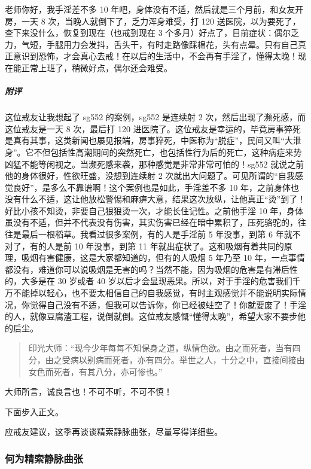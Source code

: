 \begin{case}
    老师你好，我手淫差不多 10 年吧，身体没有不适，然后就是三个月前，和女友开房，一天 8 次，当晚人就倒下了，乏力浑身难受，打 120 送医院，以为要死了，查下来没什么，恢复到现在（也戒到现在 3 个多月）好点了，目前症状：偶尔乏力，气短，手腿用力会发抖，舌头干，有时走路像踩棉花，头有点晕。只有自己真正意识到恐怖，才会真心去戒！在以后的生活中，不会再有手淫了，懂得太晚！现在能正常上班了，稍微好点，偶尔还会难受。
    \subparagraph{附评} 这位戒友让我想起了 sg552 的案例，sg552 是连续射 2 次，然后出现了濒死感，而这位戒友是一天 8 次，最后打 120 进医院了。这位戒友是幸运的，毕竟房事猝死是真有其事，这类新闻也屡见报端，房事猝死，中医称为“脱症”，民间又叫“大泄身”。它不但包括性高潮期间的突然死亡，也包括性行为后的死亡，这种病症来势凶猛不能等闲视之。当濒死感来袭，那种感觉是非常非常可怕的！sg552 就说之前他的身体很好，性欲旺盛，没想到连续射 2 次就出大问题了。可见所谓的“自我感觉良好”，是多么不靠谱啊！这个案例也是如此，手淫差不多 10 年，之前身体也没有什么不适，这让他放松警惕和麻痹大意，结果这次放纵，让他真正“烫”到了！好比小孩不知烫，非要自己狠狠烫一次，才能长住记性。之前他手淫 10 年，身体虽没有不适，但并不代表没有伤害，其实伤害已经在暗中累积了，压死骆驼的，往往是最后一根稻草。我看过很多案例，有的人是手淫前 5 年没事，到第 6 年就不对了，有的人是前 10 年没事，到第 11 年就出症状了。这和吸烟有着共同的原理，吸烟有害健康，这是大家都知道的，但有的人吸烟 5 年乃至 10 年，一点事情都没有，难道你可以说吸烟是无害的吗？当然不能，因为吸烟的危害是有滞后性的，大多是在 30 岁或者 40 岁以后才会显现恶果。所以，对于手淫的危害我们千万不能掉以轻心，也不要太相信自己的自我感觉，有时主观感觉并不能说明实际情况，你觉得自己没有不适，但我可以告诉你，你已经被蛀空了！你就要废了！手淫的人，就像豆腐渣工程，说倒就倒。这位戒友感慨“懂得太晚”，希望大家不要步他的后尘。

    \begin{quote}
        印光大师：“现今少年每每不知保身之道，纵情色欲。由之而死者，当有四分，由之受病以别病而死者，亦有四分。举世之人，十分之中，直接间接由女色而死者，有其八分，亦可惨也。”
    \end{quote}

    大师所言，诚良言也！不可不听，不可不慎！
\end{case}

下面步入正文。

应戒友建议，这季再谈谈精索静脉曲张，尽量写得详细些。

\subsubsection{何为精索静脉曲张}

